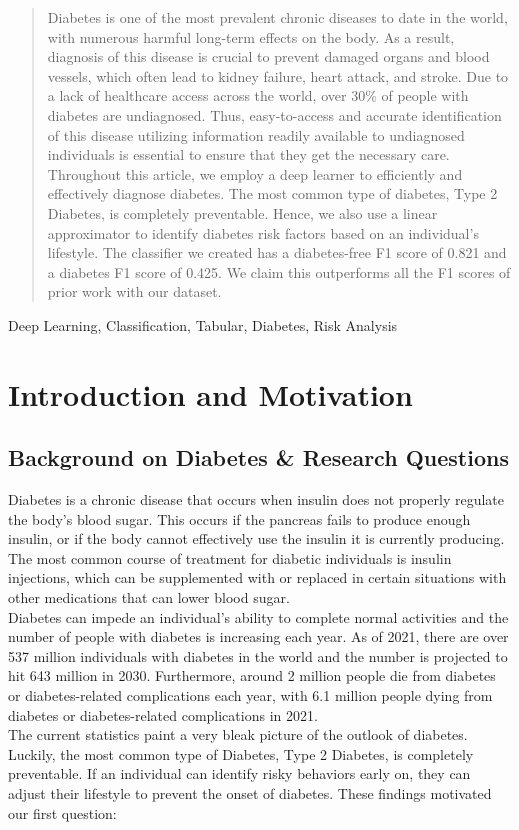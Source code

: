\documentclass[conference]{IEEEtran}
\begin{document}
\begin{abstract}
Diabetes is one of the most prevalent chronic diseases to date in the world, with numerous harmful long-term effects on the body. As a result, diagnosis of this disease is crucial to prevent damaged organs and blood vessels, which often lead to kidney failure, heart attack, and stroke. Due to a lack of healthcare access across the world, over 30\% of people with diabetes are undiagnosed.  Thus, easy-to-access and accurate identification of this disease utilizing information readily available to undiagnosed individuals is essential to ensure that they get the necessary care. Throughout this article, we employ a deep learner to efficiently and effectively diagnose diabetes. The most common type of diabetes, Type 2 Diabetes, is completely preventable. Hence, we also use a linear approximator to identify diabetes risk factors based on an individual’s lifestyle. The classifier we created has a diabetes-free F1 score of 0.821 and a diabetes F1 score of 0.425. We claim this outperforms all the F1 scores of prior work with our dataset. \\
\end{abstract}

\begin{IEEEkeywords}
Deep Learning, Classification, Tabular, Diabetes, Risk Analysis
\end{IEEEkeywords}

\section{Introduction and Motivation}\label{sec:intro}
    \subsection{Background on Diabetes \& Research Questions}
Diabetes is a chronic disease that occurs when insulin does not properly regulate the body’s blood sugar. This occurs if the pancreas fails to produce enough insulin, or if the body cannot effectively use the insulin it is currently producing. The most common course of treatment for diabetic individuals is insulin injections, which can be supplemented with or replaced in certain situations with other medications that can lower blood sugar\cite{b2}. \\
\indent Diabetes can impede an individual’s ability to complete normal activities and the number of people with diabetes is increasing each year. As of 2021, there are over 537 million individuals with diabetes in the world and the number is projected to hit 643 million in 2030\cite{b4}. Furthermore, around 2 million people die from diabetes or diabetes-related complications each year\cite{b2}, with 6.1 million people dying from diabetes or diabetes-related complications in 2021\cite{b4}. \\
\indent The current statistics paint a very bleak picture of the outlook of diabetes. Luckily, the most common type of Diabetes, Type 2 Diabetes, is completely preventable. If an individual can identify risky behaviors early on, they can adjust their lifestyle to prevent the onset of diabetes. These findings motivated our first question:
\end{document}
